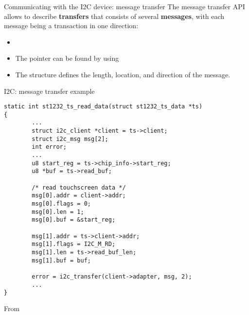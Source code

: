 \begin{frame}{Communicating with the I2C device: message transfer}
  The message transfer API allows to describe {\bf transfers} that
  consists of several {\bf messages}, with each message being a
  transaction in one direction:
  \begin{itemize}
  \item
  \item The  pointer can be found by using
  \item The  structure defines the length, location, and
    direction of the message.
  \end{itemize}
\end{frame}

\begin{frame}[fragile]{I2C: message transfer example}
\begin{block}{}
  \begin{verbatim}
static int st1232_ts_read_data(struct st1232_ts_data *ts)
{
        ...
        struct i2c_client *client = ts->client;
        struct i2c_msg msg[2];
        int error;
        ...
        u8 start_reg = ts->chip_info->start_reg;
        u8 *buf = ts->read_buf;

        /* read touchscreen data */
        msg[0].addr = client->addr;
        msg[0].flags = 0;
        msg[0].len = 1;
        msg[0].buf = &start_reg;

        msg[1].addr = ts->client->addr;
        msg[1].flags = I2C_M_RD;
        msg[1].len = ts->read_buf_len;
        msg[1].buf = buf;

        error = i2c_transfer(client->adapter, msg, 2);
        ...
}
\end{verbatim}
\end{block}
From 
\end{frame}

